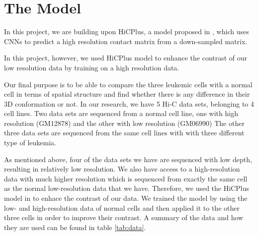 \documentclass{article}
\begin{document}
\section{The Model}
In this project, we are building upon
HiCPlus, a model proposed in 
\cite{zhang2018enhancing}, which
uses CNNs
to predict a high resolution contact
matrix from a down-sampled matrix.

In this project, however,
we used HiCPlus
model to enhance the contrast of our
low resolution data by training on
a high resolution data.

Our final purpose is to be able to
compare the three leukemic
cells with a normal cell
in terms of spatial
structure and find whether there is 
any difference in their 3D conformation
or not.
In our research, we have 5 Hi-C data sets,
belonging to
4 cell lines. Two data sets are  sequenced
from a normal cell line, one 
with high resolution (GM12878) and the
other with low resolution (GM06990)
The other three data sets are
sequenced from the same
cell lines with with three different
type of leukemia.

As mentioned above, four of the data 
sets we have are sequenced
with low depth, resulting in relatively
low resolution. 
We also have access to a high-resolution
data with much higher resolution which
is sequenced from exactly the same cell
as the normal low-resolution data that
we have. 
Therefore, we used the
HiCPlus model in \cite{zhang2018enhancing}
to enhace the contrast of our data.
We trained  the model
by using the low- and high-resolution data
of normal cells and then applied it to the 
other three cells in order to improve
their contrast.
A summary of the data and how
they are used can be 
found in table \ref{tab:data}.
\end{document}
